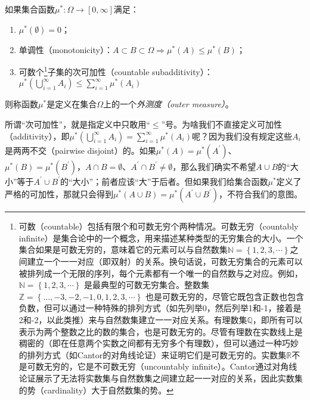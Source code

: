 \documentclass[main.tex]{subfiles}
\begin{document}
\begin{definition}[外测度]
    如果集合函数$\mu^*:\Omega\rightarrow\left[0,\infty\right]$满足：
    \begin{enumerate}
        \item $\mu^*\left(\emptyset\right)=0$；
        \item 单调性（monotonicity）：$A\subset B\subset \Omega\Rightarrow\mu^*\left(A\right)\leq\mu^*\left(B\right)$；
        \item 可数个\footnote{
                  可数（countable）包括有限个和可数无穷个两种情况。可数无穷（countably infinite）是集合论中的一个概念，用来描述某种类型的无穷集合的大小。一个集合如果是可数无穷的，意味着它的元素可以与自然数集$\mathbb{N} = \left\{1, 2, 3, \cdots\right\}$之间建立一个一一对应（即双射）的关系。换句话说，可数无穷集合的元素可以被排列成一个无限的序列，每个元素都有一个唯一的自然数与之对应。例如，$\mathbb{N} = \left\{1, 2, 3, \cdots\right\}$ 是最典型的可数无穷集合。整数集$\mathbb{Z} = \left\{\ldots, -3, -2, -1, 0, 1, 2, 3, \cdots\right\}$ 也是可数无穷的，尽管它既包含正数也包含负数，但可以通过一种特殊的排列方式（如先列举0，然后列举1和-1，接着是2和-2，以此类推）来与自然数集建立一一对应关系。有理数集$\mathbb{Q}$，即所有可以表示为两个整数之比的数的集合，也是可数无穷的。尽管有理数在实数线上是稠密的（即在任意两个实数之间都有无穷多个有理数），但可以通过一种巧妙的排列方式（如Cantor的对角线论证）来证明它们是可数无穷的。实数集$\mathbb{R}$不是可数无穷的，它是不可数无穷（uncountably infinite）。Cantor通过对角线论证展示了无法将实数集与自然数集之间建立起一一对应的关系，因此实数集的势（cardinality）大于自然数集的势。}子集的次可加性（countable subadditivity）：$\mu^*\left(\bigcup_{i=1}^\infty A_i\right)\leq \sum_{i=1}^\infty\mu^*\left(A_i\right)$
    \end{enumerate}
    则称函数$\mu^*$是定义在集合$\Omega$上的一个\emph{外测度（outer measure）}。
\end{definition}

所谓“次可加性”，就是指定义中只敢用“$\leq$”号。为啥我们不直接定义可加性（additivity），即$\mu^*\left(\bigcup_{i=1}^\infty A_i\right)=\sum_{i=1}^\infty\mu^*\left(A_i\right)$呢？因为我们没有规定这些$A_i$是两两不交（pairwise disjoint）的。如果$\mu^*\left(A\right)=\mu^*\left(A^\prime\right)$、$\mu^*\left(B\right)=\mu^*\left(B^\prime\right)$，$A\cap B=\emptyset$、$A^\prime\cap B^\prime\neq\emptyset$，那么我们确实不希望$A\cup B$的“大小”等于$A^\prime\cup B^\prime$的“大小”；前者应该“大”于后者。但如果我们给集合函数$\mu^*$定义了严格的可加性，那就只会得到$\mu^*\left(A\cup B\right)=\mu^*\left(A^\prime\cup B^\prime\right)$，不符合我们的意图。
\end{document}
